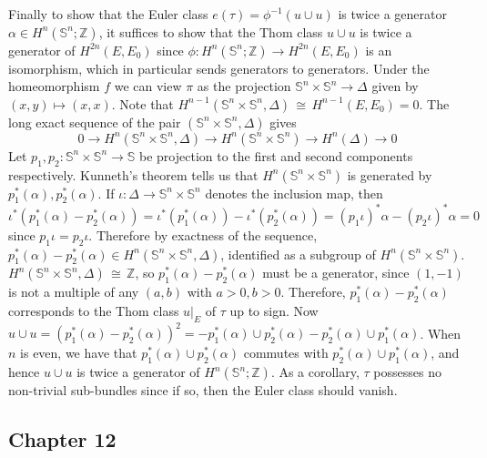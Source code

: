 \documentclass[12pt]{article}
\theoremstyle{plain}
\theoremstyle{definition}
\newcommand{\IS}{\mathbb{S}}
\newcommand{\IZ}{\mathbb{Z}}
\newcommand\iso{\,{\cong}\,}
\newcommand{\<}{\langle}
\renewcommand{\>}{\rangle}
\begin{document}
Finally to show that the Euler class $e(\tau) = \phi^{-1}( u \cup u)$ is twice a generator $\alpha \in H^n(\IS^n; \IZ)$, it suffices to show that the Thom class $u \cup u$ is twice a generator of $H^{2n}(E, E_0)$ since $\phi : H^n(\IS^n; \IZ) \to H^{2n}(E, E_0)$ is an isomorphism, which in particular sends generators to generators. Under the homeomorphism $f$ we can view $\pi$ as the projection $\IS^n \times \IS^n \to \Delta$ given by $(x, y) \mapsto (x, x)$. Note that $H^{n-1}(\IS^n \times \IS^n, \Delta) \iso H^{n-1}(E, E_0) = 0$. The long exact sequence of the pair $(\IS^n \times \IS^n, \Delta)$ gives 
$$ 0 \to H^n(\IS^n \times \IS^n, \Delta) \to H^n(\IS^n \times \IS^n) \to H^n(\Delta) \to 0$$
Let $p_1, p_2 : \IS^n \times \IS^n \to \IS$ be projection to the first and second components respectively. Kunneth's theorem tells us that 
$H^n(\IS^n \times \IS^n)$ is generated by $p_1^*(\alpha), p_2^*(\alpha)$. If $\iota : \Delta \to \IS^n \times \IS^n$ denotes the inclusion map, then $$\iota^*(p_1^*(\alpha)- p_2^*(\alpha)) = \iota^*(p_1^*(\alpha)) - \iota^*(p_2^*(\alpha)) = (p_1 \iota)^* \alpha - (p_2 \iota)^* \alpha = 0$$
since $p_1 \iota = p_2 \iota$. Therefore by exactness of the sequence, $p_1^*(\alpha) - p_2^*(\alpha) \in H^n(\IS^n \times \IS^n, \Delta)$, identified as a subgroup of $H^n(\IS^n \times \IS^n)$. $H^n(\IS^n \times \IS^n, \Delta) \iso \IZ$, so $p_1^*(\alpha) - p_2^*(\alpha)$ must be a generator, since $(1, -1)$ is not a multiple of any $(a, b)$ with $a > 0, b> 0$. Therefore, $p_1^*(\alpha) - p_2^*(\alpha)$ corresponds to the Thom class $u|_E$ of $\tau$ up to sign. Now $u \cup u = (p_1^*(\alpha) - p_2^*(\alpha))^2 = - p_1^*(\alpha) \cup  p_2^*(\alpha) - p_2^*(\alpha) \cup  p_1^*(\alpha)$. When $n$ is even, we have that $p_1^*(\alpha) \cup  p_2^*(\alpha)$ commutes with $p_2^*(\alpha) \cup  p_1^*(\alpha)$, and hence $u \cup u$ is twice a generator of $H^n(\IS^n; \IZ)$. As a corollary, $\tau$ possesses no non-trivial sub-bundles since if so, then the Euler class should vanish. 

\subsection*{Chapter 12}
\end{document}
